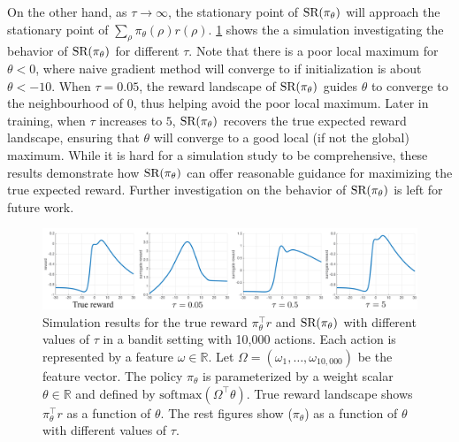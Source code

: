 On the other hand, as $\tau \to \infty$,
the stationary point of $\text{SR}(\pi_\theta)$ will approach the
stationary point of $\sum_{\rho}{ \pi_\theta(\rho) r(\rho) }$.
\cref{fig:srsimulation} shows the a simulation
investigating the behavior of $\text{SR}(\pi_\theta)$ for different $\tau$.
Note that there is a poor local maximum for $\theta <0$,
where naive gradient method will converge to if initialization is
about $\theta < -10$. 
When $\tau = 0.05$, the reward landscape of $\text{SR}(\pi_\theta)$ guides
$\theta$ to converge to the neighbourhood of $0$,
thus helping avoid the poor local maximum.
Later in training, when $\tau$ increases to $5$,
$\text{SR}(\pi_\theta)$ recovers the true expected reward landscape,
ensuring that $\theta$ will converge to a good local (if not the global)
maximum.
While it is hard for a simulation study to be comprehensive,
these results demonstrate how $\text{SR}(\pi_\theta)$ can offer reasonable guidance
for maximizing the true expected reward.
Further investigation on the behavior of $\text{SR}(\pi_\theta)$
is left for future work.
 
\begin{figure}[t]
\begin{center}
\includegraphics[width=1.0\linewidth]{./sr_simulation.pdf}
\end{center}
\caption{
Simulation results for the true reward $\pi_\theta^\top r$ and $\text{SR}(\pi_\theta)$
with different values of $\tau$ in a bandit setting with 10,000 actions. Each action is represented by a feature $\omega\in \mathbb{R}$. Let $\Omega = \left( \omega_1, \dots, \omega_{10,000} \right)$ be the feature vector. The policy $\pi_\theta$ is parameterized by a weight scalar $\theta\in \mathbb{R}$ and defined by $\text{softmax}(\Omega^{\top}\theta)$. True reward landscape shows $\pi_\theta^\top r$ as a function of $\theta$. The rest figures show \SR($\pi_\theta$) as a function of $\theta$ with different values of $\tau$.}
\label{fig:srsimulation}
\end{figure}

